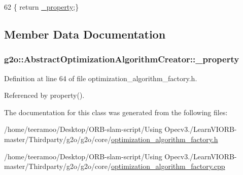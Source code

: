 \begin{DoxyCode}
62 \{ \textcolor{keywordflow}{return} \hyperlink{classg2o_1_1AbstractOptimizationAlgorithmCreator_acf2663d0d6dec71049e4853a9825eafb}{\_property};\}
\end{DoxyCode}


\subsection{Member Data Documentation}
\subsubsection[{\texorpdfstring{\+\_\+property}{_property}}]{ g2o\+::\+Abstract\+Optimization\+Algorithm\+Creator\+::\+\_\+property\hspace{0.3cm}{\ttfamily [protected]}}\hypertarget{classg2o_1_1AbstractOptimizationAlgorithmCreator_acf2663d0d6dec71049e4853a9825eafb}{}\label{classg2o_1_1AbstractOptimizationAlgorithmCreator_acf2663d0d6dec71049e4853a9825eafb}


Definition at line 64 of file optimization\+\_\+algorithm\+\_\+factory.\+h.



Referenced by property().



The documentation for this class was generated from the following files\+:\begin{DoxyCompactItemize}
\item 
/home/teeramoo/\+Desktop/\+O\+R\+B-\/slam-\/script/\+Using Opecv3./\+Learn\+V\+I\+O\+R\+B-\/master/\+Thirdparty/g2o/g2o/core/\hyperlink{optimization__algorithm__factory_8h}{optimization\+\_\+algorithm\+\_\+factory.\+h}\item 
/home/teeramoo/\+Desktop/\+O\+R\+B-\/slam-\/script/\+Using Opecv3./\+Learn\+V\+I\+O\+R\+B-\/master/\+Thirdparty/g2o/g2o/core/\hyperlink{optimization__algorithm__factory_8cpp}{optimization\+\_\+algorithm\+\_\+factory.\+cpp}\end{DoxyCompactItemize}
